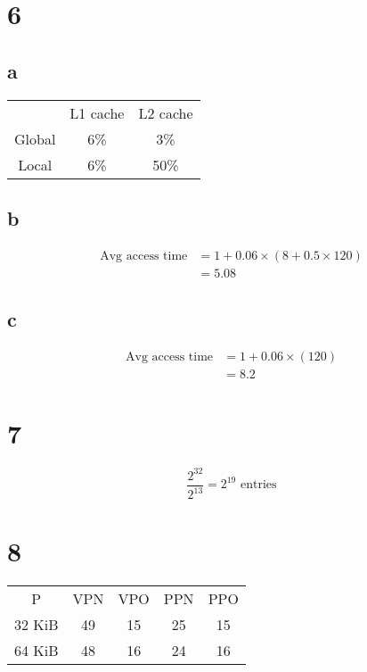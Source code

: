\documentclass{article}
\begin{document}
\begin{multicols}{2}
    \section*{6}
    \subsection*{a}
    \begin{center}
        \begin{tabular}{ c c c }
                   & L1 cache & L2 cache \\
            Global & 6\%      & 3\%      \\
            Local  & 6\%      & 50\%     \\
        \end{tabular}
    \end{center}
    \subsection*{b}
    \begin{align*}
        \text{Avg access time} & = 1 + 0.06 \times \left( 8 +  0.5 \times 120 \right) \\
                               & = 5.08
    \end{align*}
    \subsection*{c}
    \begin{align*}
        \text{Avg access time} & = 1 + 0.06 \times \left( 120 \right) \\
                               & = 8.2
    \end{align*}

    \section*{7}
    \[
        \frac{2^{32}}{2^{13}} = 2^{19} \text{ entries}
    \]
    \section*{8}
    \begin{center}
        \begin{tabular}{ c c c c c }
            P      & VPN & VPO & PPN & PPO \\
            32 KiB & 49  & 15  & 25  & 15  \\
            64 KiB & 48  & 16  & 24  & 16  \\
        \end{tabular}
    \end{center}
\end{multicols}
\end{document}
